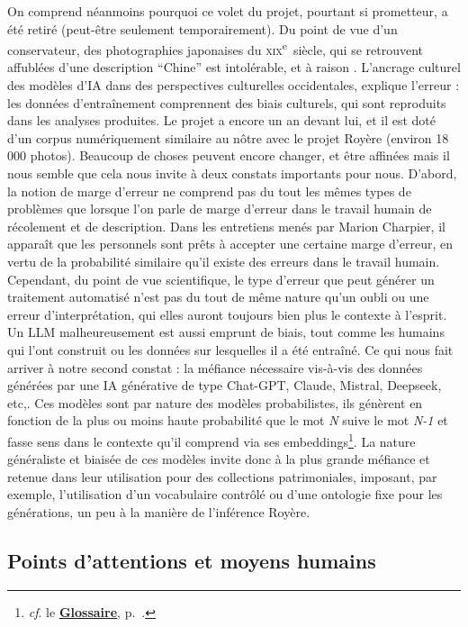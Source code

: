 On comprend néanmoins pourquoi ce volet du projet, pourtant si prometteur, a été retiré (peut-être seulement temporairement). Du point de vue d'un conservateur, des photographies japonaises du \textsc{xix}\textsuperscript{e}~siècle, qui se retrouvent affublées d'une description \enquote{Chine} est intolérable, et à raison . L'ancrage culturel des modèles d'IA dans des perspectives culturelles occidentales, explique l'erreur : les données d'entraînement comprennent des biais culturels, qui sont reproduits dans les analyses produites. Le projet a encore un an devant lui, et il est doté d'un corpus numériquement similaire au nôtre avec le projet Royère (environ 18 000 photos). Beaucoup de choses peuvent encore changer, et être affinées mais il nous semble que cela nous invite à deux constats importants pour nous. D'abord, la notion de marge d'erreur ne comprend pas du tout les mêmes types de problèmes que lorsque l'on parle de marge d'erreur dans le travail humain de récolement et de description. Dans les entretiens menés par Marion Charpier, il apparaît que les personnels sont prêts à accepter une certaine marge d'erreur, en vertu de la probabilité similaire qu'il existe des erreurs dans le travail humain. Cependant, du point de vue scientifique, le type d'erreur que peut générer un traitement automatisé n'est pas du tout de même nature qu'un oubli ou une erreur d'interprétation, qui elles auront toujours bien plus le contexte à l'esprit. Un LLM malheureusement est aussi emprunt de biais, tout comme les humains qui l'ont construit ou les données sur lesquelles il a été entraîné. Ce qui nous fait arriver à notre second constat : la méfiance nécessaire vis-à-vis des données générées par une IA générative de type Chat-GPT, Claude, Mistral, Deepseek, etc,. Ces modèles sont par nature des modèles probabilistes, ils génèrent en fonction de la plus ou moins haute probabilité que le mot \textit{N} suive le mot \textit{N-1} et fasse sens dans le contexte qu'il comprend via ses embeddings\footnote{\textit{cf}. le \textbf{\hyperref[sec:Glossaire]{Glossaire}}, p.~\pageref{sec:Glossaire}.}. La nature généraliste et biaisée de ces modèles invite donc à la plus grande méfiance et retenue dans leur utilisation pour des collections patrimoniales, imposant, par exemple, l'utilisation d'un vocabulaire contrôlé ou d'une ontologie fixe pour les générations, un peu à la manière de l'inférence Royère.

\subsection{Points d'attentions et moyens humains}

